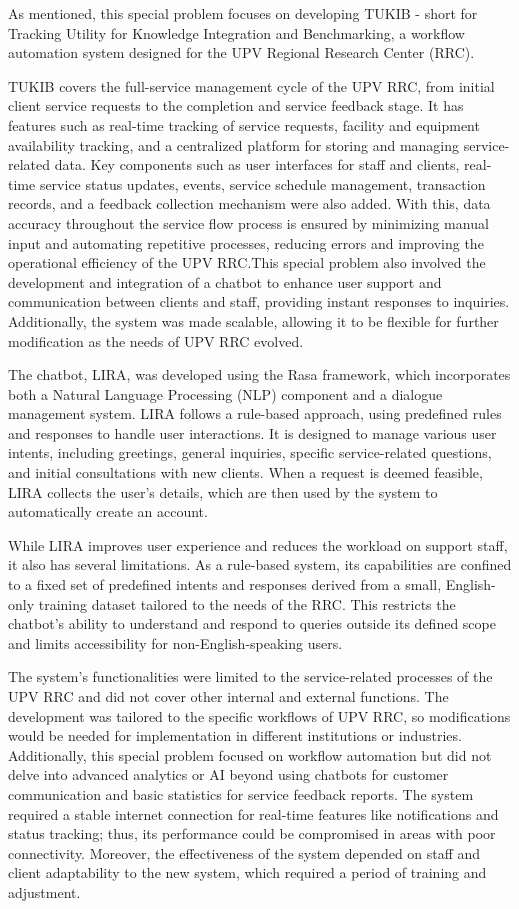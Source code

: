 As mentioned, this special problem focuses on developing TUKIB - short for Tracking Utility for Knowledge Integration and Benchmarking, a workflow automation system designed for the UPV Regional Research Center (RRC). 

TUKIB covers the full-service management cycle of the UPV RRC, from initial client service requests to the completion and service feedback stage. It has features such as real-time tracking of service requests, facility and equipment availability tracking, and a centralized platform for storing and managing service-related data. Key components such as user interfaces for staff and clients, real-time service status updates, events, service schedule management, transaction records, and a feedback collection mechanism were also added. With this, data accuracy throughout the service flow process is ensured by minimizing manual input and automating repetitive processes, reducing errors and improving the operational efficiency of the UPV RRC.This special problem also involved the development and integration of a chatbot to enhance user support and communication between clients and staff, providing instant responses to inquiries. Additionally, the system was made scalable, allowing it to be flexible for further modification as the needs of UPV RRC evolved.

The chatbot, LIRA, was developed using the Rasa framework, which incorporates both a Natural Language Processing (NLP) component and a dialogue management system. LIRA follows a rule-based approach, using predefined rules and responses to handle user interactions. It is designed to manage various user intents, including greetings, general inquiries, specific service-related questions, and initial consultations with new clients. When a request is deemed feasible, LIRA collects the user's details, which are then used by the system to automatically create an account.

While LIRA improves user experience and reduces the workload on support staff, it also has several limitations. As a rule-based system, its capabilities are confined to a fixed set of predefined intents and responses derived from a small, English-only training dataset tailored to the needs of the RRC. This restricts the chatbot’s ability to understand and respond to queries outside its defined scope and limits accessibility for non-English-speaking users.

The system’s functionalities were limited to the service-related processes of the UPV RRC and did not cover other internal and external functions. The development was tailored to the specific workflows of UPV RRC, so modifications would be needed for implementation in different institutions or industries. Additionally, this special problem focused on workflow automation but did not delve into advanced analytics or AI beyond using chatbots for customer communication and basic statistics for service feedback reports. The system required a stable internet connection for real-time features like notifications and status tracking; thus, its performance could be compromised in areas with poor connectivity. Moreover, the effectiveness of the system depended on staff and client adaptability to the new system, which required a period of training and adjustment.

